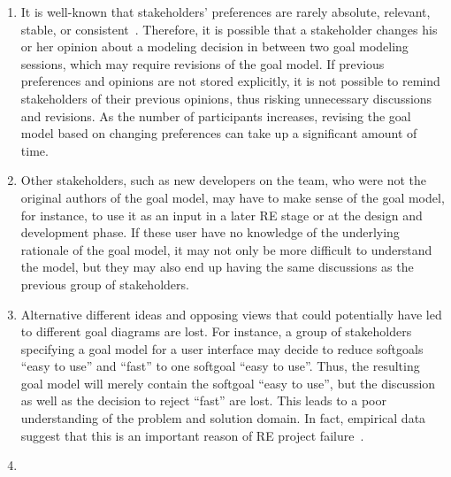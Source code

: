 
\begin{enumerate}
\item
It is well-known that stakeholders' preferences are rarely absolute, relevant, stable, or consistent~\cite{march1978bounded}. Therefore, it is possible that a stakeholder changes his or her opinion about a modeling decision in between two goal modeling sessions, which may require revisions of the goal model. If previous preferences and opinions are not stored explicitly, it is not possible to remind stakeholders of their previous opinions, thus risking unnecessary discussions and revisions. As the number of participants increases, revising the goal model based on changing preferences can take up a significant amount of time. 
\item
Other stakeholders, such as new developers on the team, who were not the original authors of the goal model, may have to make sense of the goal model, for instance, to use it as an input in a later RE stage or at the design and development phase. If these user have no knowledge of the underlying rationale of the goal model, it may not only be more difficult to understand the model, but they may also end up having the same discussions as the previous group of stakeholders. %
\item
Alternative different ideas and opposing views that could potentially have led to different goal diagrams are lost. For instance, a group of stakeholders specifying a goal model for a user interface may decide to reduce softgoals ``easy to use'' and ``fast'' to one softgoal ``easy to use''. Thus, the resulting goal model will merely contain the softgoal ``easy to use'', but the discussion as well as the decision to reject ``fast'' are lost. This leads to a poor understanding of the problem and solution domain. In fact, empirical data suggest that this is an important reason of RE project failure~\cite{curtis1988field}. 
\item

\end{enumerate}
